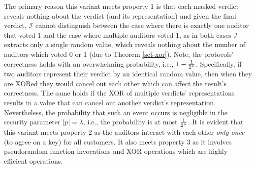 The primary reason this variant meets property 1 is that each masked verdict reveals nothing about the verdict (and its representation) and given the final verdict, $\mathcal{I}$ cannot distinguish between the case where there is exactly one auditor that voted  $1$ and the case where multiple auditors voted $1$, as in both cases $\mathcal{I}$   extracts only a single random value, which reveals nothing about the number of auditors which voted $0$ or $1$ (due to Theorem \ref{set-xor}).   Note,  the protocols' correctness holds with an overwhelming probability, i.e., $1-\frac{1}{2^{\scriptscriptstyle \lambda}}$. Specifically, if two auditors represent their verdict by an identical random value, then when they are XORed they would cancel out each other which can affect the result's correctness. The same holds if the XOR of multiple verdicts' representations results in a value that can cancel out another verdict's representation. Nevertheless, the probability that such an event occurs is negligible in the security parameter $|p|=\lambda$, i.e., the probability is at most   $\frac{1}{2^{\scriptscriptstyle \lambda}}$. It is evident that this variant meets property 2 as the auditors interact with each other \emph{only once} (to agree on a key) for all customers. It also meets property 3 as it involves pseudorandom function invocations and XOR operations which are highly efficient operations. 



